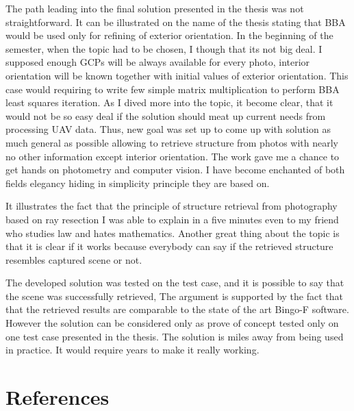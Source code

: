 \documentclass[a4paper,12pt]{article}
\begin{document}
The path leading into the final solution presented in the thesis was not straightforward.
It can be illustrated on the name of the thesis stating that BBA would be 
used only for refining of exterior orientation. In the beginning of the semester, when the topic had to be chosen, I though that 
its not big deal. 
I supposed enough GCPs will be 
always available for every photo, interior orientation will be 
known together with initial values of exterior orientation.
This case would requiring to write few simple matrix multiplication to 
perform BBA least squares iteration.
As I dived more into the topic, it become clear, that it would not be so easy deal 
 if the solution should meat up current needs from processing UAV data.
Thus, new goal was set up to come up with solution as much general 
 as possible allowing to retrieve structure from photos with nearly no other information except interior orientation.
The work gave me a chance to get hands on photometry and computer vision. I have become enchanted
of both fields elegancy hiding in simplicity principle they are based on.  

It illustrates the fact that the principle of structure retrieval from photography based on ray resection
I was able to explain in a five minutes even to my friend who studies 
law and hates mathematics.
Another great thing about the topic is that it is clear if it works because
 everybody can say if the retrieved structure resembles captured scene or not. 
 
 
 The developed solution was tested on the test case, and it is possible to say that 
 the scene was successfully retrieved, The argument is supported by the fact that 
 that the retrieved results are comparable to the state of the art Bingo-F software.
 However  the solution can be considered only as prove of concept tested only on one test case presented in the thesis. 
 The solution is miles away from being used in practice. 
 It would require years to make it really working.


\section{References}





\end{document}
